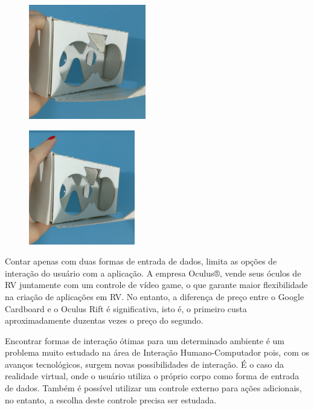 \begin{figure}[H]
	
	\begin{minipage}{.5\textwidth}{
			\centering
			\includegraphics[height=5cm]{Imagens/botaocardboard1.jpg}		
			\label{f.botaocardboard1}
		}
	\end{minipage}
	\begin{minipage}{.5\textwidth}{
			\centering
			\includegraphics[height=5cm]{Imagens/botaocardboard2.jpg}		
			\label{f.botaocardboard2}	
		}
	\end{minipage}
\end{figure}

Contar apenas com duas formas de entrada de dados, limita as opções de interação do usuário com a aplicação. A empresa Oculus®, vende seus óculos de RV juntamente com um controle de vídeo game, o que garante maior flexibilidade na criação de aplicações em RV. No entanto, a diferença de preço entre o Google Cardboard e o Oculus Rift é significativa, isto é,  o primeiro custa aproximadamente duzentas vezes o preço do segundo.

Encontrar formas de interação ótimas para um determinado ambiente é um problema muito estudado na área de Interação Humano-Computador pois, com os avanços tecnológicos, surgem novas possibilidades de interação. É o caso da realidade virtual, onde o usuário utiliza o próprio corpo como forma de entrada de dados. Também é possível utilizar um controle externo para ações adicionais, no entanto, a escolha deste controle precisa ser estudada.

